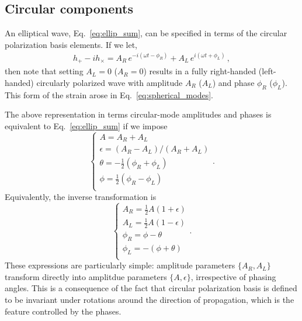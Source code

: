 \documentclass[aps,prd,twocolumn,superscriptaddress,preprintnumbers,floatfix,nofootinbib]{revtex4-2}
\begin{document}
\subsection{Circular components}

An elliptical wave, Eq.~\eqref{eq:ellip_sum}, can be specified in terms of the circular polarization basis elements.
If we let,
\begin{align} \label{eq:Cphi}
h_+ - i h_\times = A_{R}\, e^{-i \left(\omega t - \phi_R \right) } + A_{L}\, e^{i \left(\omega t + \phi_L \right) }\, ,
\end{align}
then note that setting $A_L = 0$ ($A_R =0$) results in a fully right-handed (left-handed) circularly polarized wave with amplitude $A_R$ ($A_L$) and phase $\phi_R$ ($\phi_L$).
This form of the strain arose in Eq.~\eqref{eq:spherical_modes}.

The above representation in terms circular-mode amplitudes and phases is equivalent to Eq.~\eqref{eq:ellip_sum} if we impose
\begin{equation} \label{eq:Cphi_to_Aellip}
\begin{cases}
A = A_R + A_L \\
\epsilon = (A_R - A_L)/(A_R + A_L) \\ 
\theta = -\frac{1}{2}(\phi_R + \phi_L)\\
\phi = \frac{1}{2}(\phi_R - \phi_L)\\
\end{cases} .
\end{equation}
Equivalently, the inverse transformation is 
\begin{equation}
\begin{cases}
A_R = \frac{1}{2} A \left(1 + \epsilon\right) \\
A_L = \frac{1}{2} A \left(1 - \epsilon\right) \\
\phi_R = \phi - \theta \\ 
\phi_L = - (\phi + \theta) \\ 
\end{cases} .
\end{equation}
These expressions are particularly simple: amplitude parameters $\{ A_R, A_L\}$ transform directly into amplitdue parameters $\{A, \epsilon\}$, irrespective of phasing angles.
This is a consequence of the fact that circular polarization basis is defined to be invariant under rotations around the direction of propagation, which is the feature controlled by the phases.
\end{document}
